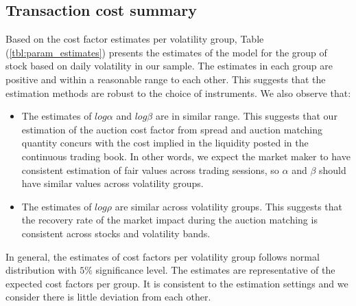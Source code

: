 \subsection{Transaction cost summary}

Based on the cost factor estimates per volatility group, Table (\ref{tbl:param_estimates}) presents the estimates of the model for the group of stock based on daily volatility in our sample. The estimates in each group are positive and within a reasonable range to each other. This suggests that the estimation methods are robust to the choice of instruments. We also observe that:
\begin{itemize}
  \item The estimates of $log \alpha$ and $log \beta$ are in similar range. This suggests that our estimation of the auction cost factor from spread and auction matching quantity concurs with the cost implied in the liquidity posted in the continuous trading book. In other words, we expect the market maker to have consistent estimation of fair values across trading sessions, so $\alpha$ and $\beta$ should have similar values across volatility groups.
  \item The estimates of $log \rho$ are similar across volatility groups. This suggests that the recovery rate of the market impact during the auction matching is consistent across stocks and volatility bands.
\end{itemize}

In general, the estimates of cost factors per volatility group follows normal distribution with $5\%$ significance level. The estimates are representative of the expected cost factors per group. It is consistent to the estimation settings and we consider there is little deviation from each other.



